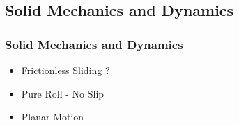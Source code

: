 \documentclass[fleqn]{beamer} %
\newcommand{\sectionIIIsubsectionIItitle}{Solid Mechanics and Dynamics}
\begin{document}
		\subsection{\sectionIIIsubsectionIItitle}\label{sectionIIIsubsectionII}	

			\begin{frame}
				\frametitle{\sectionIIIsubsectionIItitle}
				\bigskip
				
				\begin{multicols}{2}
				\begin{itemize}
				\item Frictionless Sliding  ?
				\item Pure Roll - No Slip 
				\item Planar Motion \\
				\end{itemize}


\end{multicols}
\end{frame}
\end{document}
